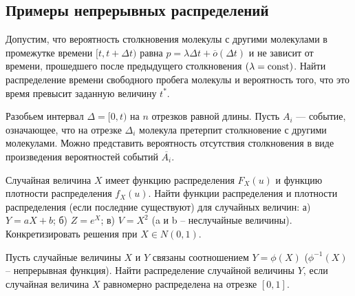 
\subsection{Примеры непрерывных распределений}

\begin{problem}
Допустим, что вероятность столкновения молекулы с другими молекулами в промежутке времени $[t,t + \Delta t)$ 
равна $p = \lambda\Delta t+{\overline o}(\Delta t)$ и не зависит от времени, прошедшего после предыдущего столкновения $(\lambda = \mathop{\mathrm{const}}\nolimits)$. 
Найти распределение времени свободного пробега молекулы и вероятность того, что это время превысит заданную величину $t^*$. 
\end{problem}

\begin{ordre}
Разобьем интервал $\Delta=[0,t)$ на $n$ отрезков равной длины.
Пусть $A_i$ --- событие, означающее, что на отрезке $\Delta_i$  молекула претерпит столкновение с другими молекулами. Можно представить вероятность отсутствия столкновения в виде произведения вероятностей событий $\overline{A_i}$.
\end{ordre}

\begin{problem}
Случайная величина $X$ имеет функцию распределения $F_X(u)$ и функцию плотности распределения $f_X(u)$. Найти функции распределения и плотности распределения (если последние существуют) для случайных величин: а) $Y = aX+b$; б) $Z =e^X$; в) $V = X^2$ (a и b – неслучайные величины). Конкретизировать решения при $X \in N(0,1)$.
\end{problem}

\begin{problem}
Пусть случайные величины $X$ и $Y$ связаны соотношением $Y = \phi(X)$ ($\phi^{-1}(X)$ – непрерывная функция). Найти распределение случайной величины $Y$, если случайная величина $X$ равномерно распределена на отрезке $[0,1]$.
\end{problem}

\begin{comment}
\begin{problem}[распределение Коши]
Радиоактивный источник испускает 
частицы в случайном направлении (при этом все направления равновероятны). 
Источник находится на расстоянии $d$ от фотопластины, которая представляет 
собой бесконечную вертикальную плоскость.

\begin{enumerate}
\item[\textbf{А)}] При условии, что частица попадает в плоскость, покажите, что 
горизонтальная координата точки попадания (если начало координат выбирается 
в точке, ближайшей к источнику) имеет плотность распределения:
\[
p\left( x \right)=\frac{d}{\pi \left( {d^2+x^2} \right)}.
\]
Это распределение известно как \textit{распределение Коши}.

\item[\textbf{Б)}] Можно ли вычислить среднее (математическое ожидание) этого 
распределения?
\end{enumerate}
\end{problem}
\end{comment}
